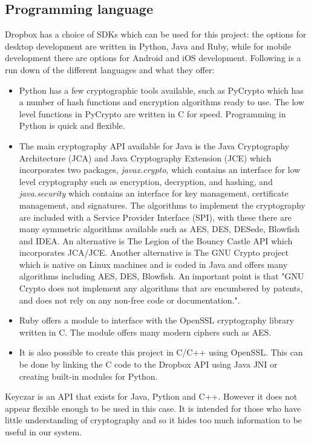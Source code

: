 \documentclass[12pt, titlepage]{article}
\begin{document}
\subsection{Programming language}
Dropbox has a choice of SDKs which can be used for this project: the options for desktop development are written in Python, Java and Ruby, while for mobile development there are options for Android and iOS development.
\newline Following is a run down of the different languages and what they offer:
\begin{itemize}
\item Python has a few cryptographic tools available, such as PyCrypto which has a number of hash functions and encryption algorithms ready to use. The low level functions in PyCrypto are written in C for speed.\cite{pyCrypto} Programming in Python is quick and flexible.
\item The main cryptography API available for Java is the Java Cryptography Architecture (JCA) and Java Cryptography Extension (JCE) which incorporates two packages, \textit{javax.crypto}, which contains an interface for low level cryptography such as encryption, decryption, and hashing, and \textit{java.security} which contains an interface for key management, certificate management, and signatures. The algorithms to implement the cryptography are included with a Service Provider Interface (SPI), with these there are many symmetric algorithms available such as AES, DES, DESede, Blowfish and IDEA\cite{javaJCA}. An alternative is The Legion of the Bouncy Castle API which incorporates JCA/JCE\cite{bouncyCastle}. Another alternative is The GNU Crypto project which is native on Linux machines and is coded in Java and offers many algorithms including AES, DES, Blowfish. An important point is that "GNU Crypto does not implement any algorithms that are encumbered by patents, and does not rely on any non-free code or documentation."\cite{gnuCrypto}.
\item Ruby offers a module to interface with the OpenSSL cryptography library written in C. The module offers many modern ciphers such as AES.\cite{rubyOpenSSL}
\item It is also possible to create this project in C/C++ using OpenSSL. This can be done by linking the C code to the Dropbox API using Java JNI or creating built-in modules for Python.
\end{itemize}
Keyczar is an API that exists for Java, Python and C++.\cite{keyczar} However it does not appear flexible enough to be used in this case. It is intended for those who have little understanding of cryptography and so it hides too much information to be useful in our system.
\end{document}
